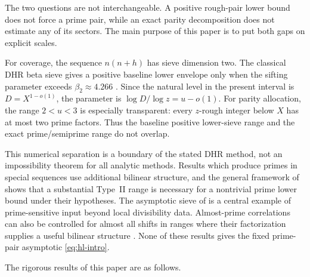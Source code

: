 \documentclass[11pt]{article}
\theoremstyle{definition}
\theoremstyle{remark}
\begin{document}
The two questions are not interchangeable.  A positive rough-pair lower bound does not force a prime pair, while an exact parity decomposition does not estimate any of its sectors.  The main purpose of this paper is to put both gaps on explicit scales.

For coverage, the sequence $n(n+h)$ has sieve dimension two.  The classical DHR beta sieve gives a positive baseline lower envelope only when the sifting parameter exceeds $\beta_2\approx4.266$ \citep{DiamondHalberstamRichert1988,DiamondHalberstam2008,Franze2011}.  Since the natural level in the present interval is $D=X^{1-o(1)}$, the parameter is $\log D/\log z=u-o(1)$.  For parity allocation, the range $2<u<3$ is especially transparent: every $z$-rough integer below $X$ has at most two prime factors.  Thus the baseline positive lower-sieve range and the exact prime/semiprime range do not overlap.

This numerical separation is a boundary of the stated DHR method, not an impossibility theorem for all analytic methods.  Results which produce primes in special sequences use additional bilinear structure, and the general framework of \citet{FordMaynard2024} shows that a substantial Type~II range is necessary for a nontrivial prime lower bound under their hypotheses.  The asymptotic sieve of \citet{FriedlanderIwaniec1998} is a central example of prime-sensitive input beyond local divisibility data.  Almost-prime correlations can also be controlled for almost all shifts in ranges where their factorization supplies a useful bilinear structure \citep{Evans2023}.  None of these results gives the fixed prime-pair asymptotic \eqref{eq:hl-intro}.

The rigorous results of this paper are as follows.
\end{document}
